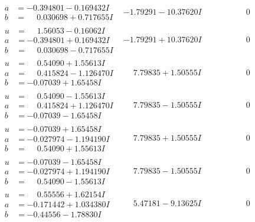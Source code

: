 \documentclass[1p]{elsarticle_modified}
\theoremstyle{definition}
\begin{document}
$$\begin{array}{c|c|c}
\begin{aligned}
a &= -0.394801 - 0.169432 I \\
b &= \phantom{-}0.030698 + 0.717655 I\end{aligned}
 & -1.79291 - 10.37620 I & \phantom{-0.000000 } 0 \\ \hline\begin{aligned}
u &= \phantom{-}1.56053 - 0.16062 I \\
a &= -0.394801 + 0.169432 I \\
b &= \phantom{-}0.030698 - 0.717655 I\end{aligned}
 & -1.79291 + 10.37620 I & \phantom{-0.000000 } 0 \\ \hline\begin{aligned}
u &= \phantom{-}0.54090 + 1.55613 I \\
a &= \phantom{-}0.415824 - 1.126470 I \\
b &= -0.07039 + 1.65458 I\end{aligned}
 & \phantom{-}7.79835 + 1.50555 I & \phantom{-0.000000 } 0 \\ \hline\begin{aligned}
u &= \phantom{-}0.54090 - 1.55613 I \\
a &= \phantom{-}0.415824 + 1.126470 I \\
b &= -0.07039 - 1.65458 I\end{aligned}
 & \phantom{-}7.79835 - 1.50555 I & \phantom{-0.000000 } 0 \\ \hline\begin{aligned}
u &= -0.07039 + 1.65458 I \\
a &= -0.027974 - 1.194190 I \\
b &= \phantom{-}0.54090 + 1.55613 I\end{aligned}
 & \phantom{-}7.79835 + 1.50555 I & \phantom{-0.000000 } 0 \\ \hline\begin{aligned}
u &= -0.07039 - 1.65458 I \\
a &= -0.027974 + 1.194190 I \\
b &= \phantom{-}0.54090 - 1.55613 I\end{aligned}
 & \phantom{-}7.79835 - 1.50555 I & \phantom{-0.000000 } 0 \\ \hline\begin{aligned}
u &= \phantom{-}0.55556 + 1.62154 I \\
a &= -0.171442 + 1.034380 I \\
b &= -0.44556 - 1.78830 I\end{aligned}
 & \phantom{-}5.47181 - 9.13625 I & \phantom{-0.000000 } 0\\

\end{array}$$
\end{document}

